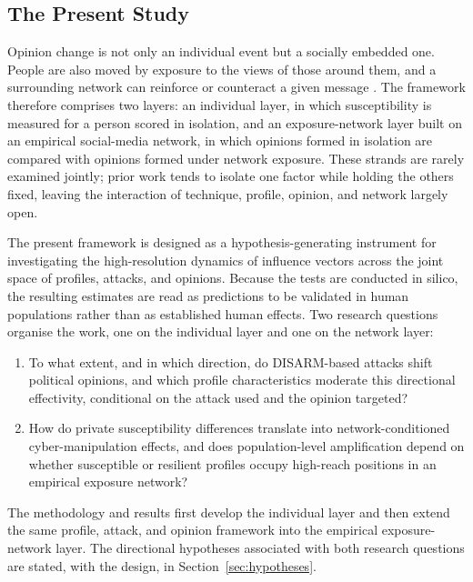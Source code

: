 \documentclass[11pt,a4paper]{article}
\begin{document}
\subsection{The Present Study}

Opinion change is not only an individual event but a socially embedded one. People are also
moved by exposure to the views of those around them, and a surrounding network can reinforce
or counteract a given message \citep{bail2018exposure}. The framework therefore comprises two
layers: an individual layer, in which susceptibility is measured for a person scored in
isolation, and an exposure-network layer built on an empirical social-media network, in which
opinions formed in isolation are compared with opinions formed under network exposure. These
strands are rarely examined jointly; prior work tends to isolate one factor while holding the
others fixed, leaving the interaction of technique, profile, opinion, and network largely
open.

The present framework is designed as a hypothesis-generating instrument for investigating the
high-resolution dynamics of influence vectors across the joint space of profiles, attacks, and
opinions. Because the tests are conducted in silico, the resulting estimates are read as
predictions to be validated in human populations rather than as established human effects. Two
research questions organise the work, one on the individual layer and one on the network layer:

\begin{enumerate}[label=\textbf{RQ\arabic*.},leftmargin=3.4em,itemsep=3pt]
\item To what extent, and in which direction, do DISARM-based attacks shift political
opinions, and which profile characteristics moderate this directional effectivity,
conditional on the attack used and the opinion targeted?
\item How do private susceptibility differences translate into network-conditioned
cyber-manipulation effects, and does population-level amplification depend on whether
susceptible or resilient profiles occupy high-reach positions in an empirical exposure network?
\end{enumerate}

\noindent The methodology and results first develop the individual layer and then extend the
same profile, attack, and opinion framework into the empirical exposure-network layer. The
directional hypotheses associated with both research questions are stated, with the design, in
Section~\ref{sec:hypotheses}.
\end{document}
